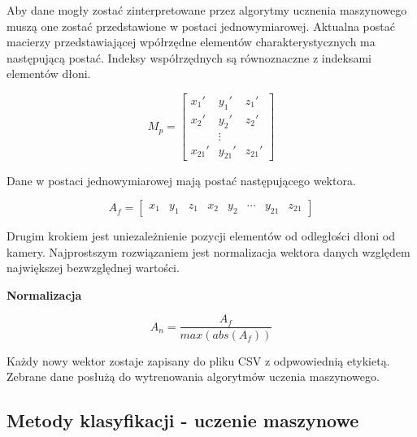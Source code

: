     \quad Aby dane mogły zostać zinterpretowane przez algorytmy ucznenia maszynowego muszą one zostać przedstawione w postaci jednowymiarowej. Aktualna postać macierzy przedstawiającej wpółrzędne elementów charakterystycznych ma następującą postać. Indeksy współrzędnych są równoznaczne z indeksami elementów dłoni. 
    
    \begin{equation*}
        M_p = 
        \begin{bmatrix}
        x_1' & y_1' & z_1' \\
        x_2' & y_2' & z_2' \\
         & \vdots &     \\
        x_{21}' & y_{21}' & z_{21}'
        \end{bmatrix}
    \end{equation*}
    
    Dane w postaci jednowymiarowej mają postać następującego wektora. 
    
    \begin{equation*}
        A_f=
        \begin{bmatrix}
            x_1 & y_1 & z_1 & x_2 & y_2 & \cdots & y_{21} & z_{21}
        \end{bmatrix}
    \end{equation*}
    
    
    \quad Drugim krokiem jest uniezależnienie pozycji elementów od odległości dłoni od kamery. Najprostszym rozwiązaniem jest normalizacja wektora danych względem największej bezwzględnej wartości. 
    
    \quad \textbf{Normalizacja}
    
    
    
    \begin{equation*}
        A_n=\dfrac{A_f}{max(abs(A_f))}
    \end{equation*}
    
    \quad Każdy nowy wektor zostaje zapisany do pliku CSV z odpwowiednią etykietą. Zebrane dane posłużą do wytrenowania algorytmów uczenia maszynowego.     
    
    \subsection{Metody klasyfikacji - uczenie maszynowe}
    
